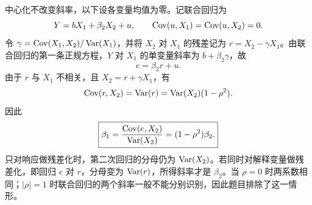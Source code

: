 中心化不改变斜率，以下设各变量均值为零。记联合回归为
\[
 Y=bX_1+\beta_2X_2+u,
 \qquad \operatorname{Cov}(u,X_1)=\operatorname{Cov}(u,X_2)=0.
\]
令 $\gamma=\operatorname{Cov}(X_1,X_2)/\operatorname{Var}(X_1)$，并将 $X_2$ 对 $X_1$ 的残差记为 $r=X_2-\gamma X_1$。由联合回归的第一条正规方程，$Y$ 对 $X_1$ 的单变量斜率为 $b+\beta_2\gamma$，故
\[
 e=\beta_2r+u.
\]
由于 $r$ 与 $X_1$ 不相关，且 $X_2=r+\gamma X_1$，有
\[
 \operatorname{Cov}(r,X_2)=\operatorname{Var}(r)
 =\operatorname{Var}(X_2)(1-\rho^2).
\]
因此
\[
 \boxed{\beta_1
 =\frac{\operatorname{Cov}(e,X_2)}{\operatorname{Var}(X_2)}
 =(1-\rho^2)\beta_2.}
\]
只对响应做残差化时，第二次回归的分母仍为 $\operatorname{Var}(X_2)$。若同时对解释变量做残差化，即回归 $e$ 对 $r$，分母变为 $\operatorname{Var}(r)$，所得斜率才是 $\beta_2$。当 $\rho=0$ 时两系数相同；$|\rho|=1$ 时联合回归的两个斜率一般不能分别识别，因此题目排除了这一情形。
